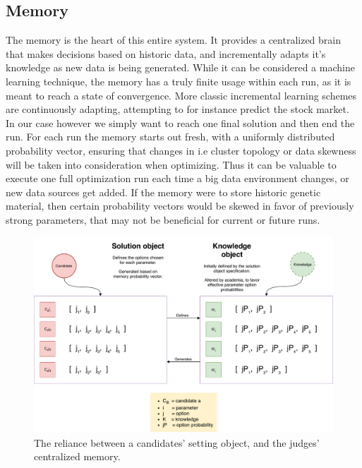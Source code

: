 \documentclass[a4paper,english]{report}
\begin{document}
		\subsection{Memory}
		\label{memory}

		The memory is the heart of this entire system. It provides a centralized brain that makes decisions based on historic data, and incrementally adapts it's knowledge as new data is being generated. While it can be considered a machine learning technique, the memory has a truly finite usage within each run, as it is meant to reach a state of convergence. More classic incremental learning schemes are continuously adapting, attempting to for instance predict the stock market. In our case however we simply want to reach one final solution and then end the run. For each run the memory starts out fresh, with a uniformly distributed probability vector, ensuring that changes in i.e cluster topology or data skewness will be taken into consideration when optimizing. Thus it can be valuable to execute one full optimization run each time a big data environment changes, or new data sources get added. If the memory were to store historic genetic material, then certain probability vectors would be skewed in favor of previously strong parameters, that may not be beneficial for current or future runs.
		\begin{figure}[h]
			\includegraphics[width=\textwidth]{memory_candidate}
			\caption{The reliance between a candidates' setting object, and the judges' centralized memory.}
		\end{figure}
		\clearpage
\end{document}
